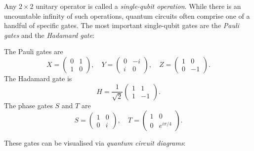 Any $2\times 2$ unitary operator is called a \emph{single-qubit operation}.
While there is an uncountable infinity of such operations, quantum circuits
often comprise one of a handful of specific gates.  The most important
single-qubit gates are the \emph{Pauli gates} and the \emph{Hadamard gate}:

\begin{definition}\label{def:pauli-hadamard}
  The Pauli gates are
  \[
    X = \begin{pmatrix} 0 & 1 \\ 1 & 0 \end{pmatrix},\quad
    Y = \begin{pmatrix} 0 & -i \\ i & 0 \end{pmatrix},\quad
    Z = \begin{pmatrix} 1 & 0 \\ 0 & -1 \end{pmatrix}.
  \]
  The Hadamard gate is
  \[
    H = \frac{1}{\sqrt{2}}\begin{pmatrix} 1 & 1 \\ 1 & -1 \end{pmatrix}.
  \]
  The phase gates $S$ and $T$ are
  \[
    S = \begin{pmatrix} 1 & 0 \\ 0 & i \end{pmatrix},\quad
    T = \begin{pmatrix} 1 & 0 \\ 0 & e^{i\pi/4} \end{pmatrix}.
  \]
\end{definition}

These gates can be visualised via \emph{quantum circuit diagrams}:
\begin{center}
\end{center}

